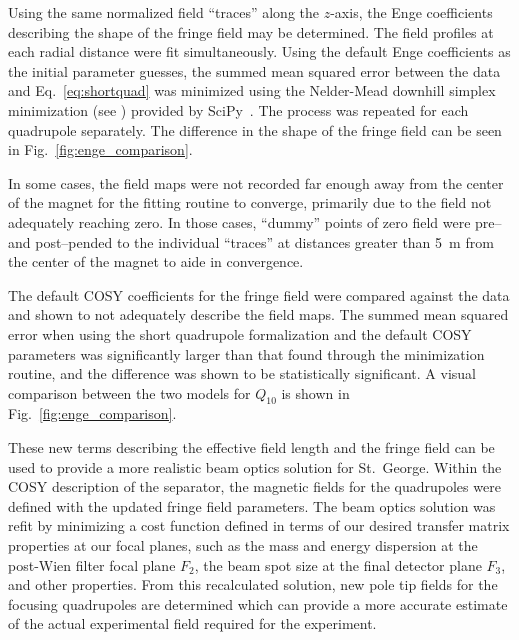 Using the same normalized field ``traces'' along the $z$-axis, the Enge
coefficients describing the shape of the fringe field may be determined.
The field profiles at each radial distance were fit simultaneously.
Using the default Enge coefficients as the initial parameter guesses,
the summed mean squared error between the data and
Eq.~\ref{eq:shortquad} was minimized using the Nelder-Mead downhill
simplex minimization (see \cite{Simplex}) provided by
SciPy~\cite{SciPy}. The process
was repeated for each quadrupole separately. The difference in the
shape of the fringe field can be seen in Fig.~\ref{fig:enge_comparison}.

In some cases, the field maps were not recorded far enough away from the
center of the magnet for the fitting routine to converge, primarily due
to the field not adequately reaching zero. In those cases, ``dummy''
points of zero field were pre\---{} and post\---{}pended to the
individual ``traces'' at distances greater than 5~m from the center of
the magnet to aide in convergence.

The default COSY coefficients for the fringe field were compared against
the data and shown to not adequately describe the field maps. The summed
mean squared error when using the short quadrupole formalization and the
default COSY parameters was significantly larger than that found through
the minimization routine, and the difference was shown to be
statistically significant. A visual comparison between the two models
for $Q_{10}$ is shown in Fig.~\ref{fig:enge_comparison}.

These new terms describing the effective field length and the fringe
field can be used to provide a more realistic beam optics solution for
St.\ George. Within the COSY description of the separator, the magnetic
fields for the quadrupoles were defined with the updated fringe field
parameters. The beam optics solution was refit by minimizing a cost
function defined in terms of our desired transfer matrix properties at
our focal planes, such as the mass and energy dispersion at the
post-Wien filter focal plane $F_2$, the beam spot size at the final
detector plane $F_3$, and other properties. From this recalculated
solution, new pole tip fields for the focusing quadrupoles are
determined which can provide a more accurate estimate of the actual
experimental field required for the experiment.

